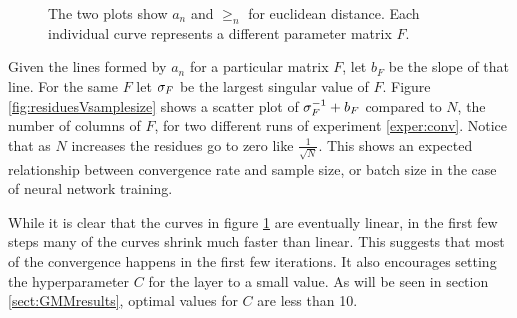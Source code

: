 \begin{figure}[h]
	
	\caption[Plots of distances and convergence errors for various \( F \) ]{The two plots show \( a_n \) and \( \ge_n \) for euclidean distance. Each individual curve represents a different parameter matrix \( F \).}\label{fig:convLines}
\end{figure}

Given the lines formed by \( a_n \) for a particular matrix \( F \), let \( b_F \) be the slope of that line. For the same \( F \) let \( \sigma_F \) be the largest singular value of \( F \). Figure \ref{fig:residuesVsamplesize} shows a scatter plot of \( \sigma_F^{-1}+b_F \) compared to \( N \), the number of columns of \( F \), for two different runs of experiment \ref{exper:conv}.  Notice that as \( N \) increases the residues go to zero like \( \frac{1}{\sqrt N} \). This shows an expected relationship between convergence rate and sample size, or batch size in the case of neural network training.

While it is clear that the curves in figure \ref{fig:convLines} are eventually linear, in the first few steps many of the curves shrink much faster than linear. This suggests that most of the convergence happens in the first few iterations. It also encourages setting the hyperparameter \( C \) for the \RS layer to a small value. As will be seen in section \ref{sect:GMMresults}, optimal values for \( C \) are less than 10.

%



